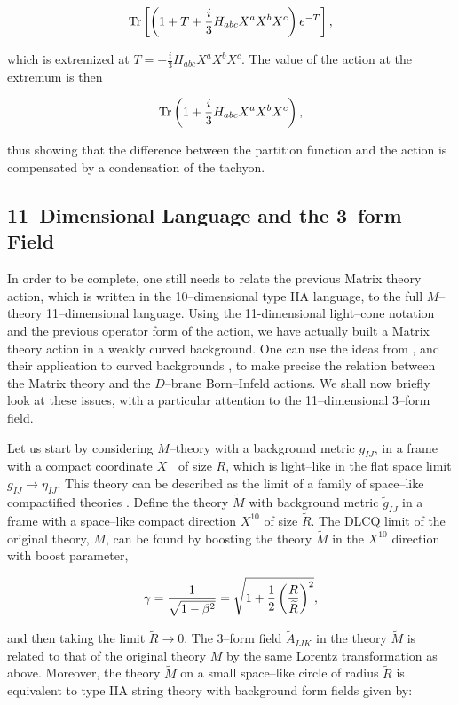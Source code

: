 \documentclass[a4paper,11pt]{article}
\begin{document}
$$
{\rm Tr} \left[ \left( 1+T+\frac{i}{3}H_{abc} X^a X^b X^c \right) 
e^{-T} \right] ,
$$

\noindent
which is extremized at $T=-\frac{i}{3}H_{abc} X^a X^b X^c$. The value
of the action at the extremum is then

$$
{\rm Tr} \left(1+ \frac{i}{3}H_{abc} X^a X^b X^c\right) ,
$$

\noindent
thus showing that the difference between the partition function and the
action is compensated by a condensation of the tachyon.


\subsection{11--Dimensional Language and the 3--form Field}


In order to be complete, one still needs to relate the previous Matrix
theory action, which is written in the 10--dimensional type IIA language,
to the full $M$--theory 11--dimensional language. Using the 11-dimensional
light--cone notation and the previous operator form of the action, we have
actually built a Matrix theory action in a weakly curved background.  One
can use the ideas from \cite{Sen, Seiberg}, and their application to curved
backgrounds \cite{Taylor-Raamsdonk-2}, to make precise the relation between
the Matrix theory and the $D$--brane Born--Infeld actions. We shall now
briefly look at these issues, with a particular attention to the
11--dimensional 3--form field.

Let us start by considering $M$--theory with a background metric $g_{IJ}$,
in a frame with a compact coordinate $X^{-}$ of size $R$, which is
light--like in the flat space limit $g_{IJ} \to \eta_{IJ}$.  This theory
can be described as the limit of a family of space--like compactified
theories \cite{Sen, Seiberg}. Define the theory $\widetilde{M}$ with
background metric $\widetilde{g}_{IJ}$ in a frame with a space--like
compact direction $X^{10}$ of size $\widetilde{R}$. The DLCQ limit of the
original theory, $M$, can be found by boosting the theory $\widetilde{M}$
in the $X^{10}$ direction with boost parameter,

$$
\gamma = {1\over \sqrt{1-\beta^{2}}} = \sqrt{1+{1\over 2} \left( {R 
\over \widetilde{R}} \right)^{2}},
$$

\noindent
and then taking the limit $\widetilde{R} \to 0$. The 3--form field
$\widetilde{A}_{IJK}$ in the theory $\widetilde{M}$ is related to that of
the original theory $M$ by the same Lorentz transformation as
above. Moreover, the theory $\widetilde{M}$ on a small space--like circle
of radius $\widetilde{R}$ is equivalent to type IIA string theory with
background form fields given by:
\end{document}
